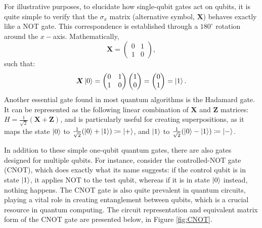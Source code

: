 For illustrative purposes, to elucidate how single-qubit gates act on qubits, it is quite simple to verify that the $\sigma_x$ matrix (alternative symbol, $\boldsymbol{X}$) behaves exactly like a NOT gate. This correspondence is established through a $180^{\circ}$ rotation around the $x-$axis. Mathematically,
\begin{equation}
\boldsymbol{X} = 
\begin{pmatrix}
0 & 1 \\
1 & 0
\end{pmatrix},
\end{equation}
such that:
\begin{equation}
\boldsymbol{X}\ket{0}
=
\begin{pmatrix}
0 & 1 \\
1 & 0
\end{pmatrix}
\begin{pmatrix}
1 \\
0
\end{pmatrix}
=
\begin{pmatrix}
0 \\
1
\end{pmatrix}
=
\ket{1}.
\end{equation}
Another essential gate found in most quantum algorithms is the Hadamard gate. It can be represented as the following linear combination of $\boldsymbol{X}$ and $\boldsymbol{Z}$ matrices: $H = \frac{1}{\sqrt{2}}\left(\boldsymbol{X} + \boldsymbol{Z}\right)$, and is particularly useful for creating superpositions, as it maps the state $\ket{0}$ to $\frac{1}{\sqrt{2}}(\ket{0} + \ket{1}) \coloneq \ket{+}$, and $\ket{1}$ to $\frac{1}{\sqrt{2}}(\ket{0} - \ket{1}) \coloneq \ket{-}$.

In addition to these simple one-qubit quantum gates, there are also gates designed for multiple qubits. For instance, consider the controlled-NOT gate (CNOT), which does exactly what its name suggests: if the control qubit is in state $\ket{1}$, it applies NOT to the test qubit, whereas if it is in state $\ket{0}$ instead, nothing happens. The CNOT gate is also quite prevalent in quantum circuits, playing a vital role in creating entanglement between qubits, which is a crucial resource in quantum computing. The circuit representation and equivalent matrix form of the CNOT gate are presented below, in Figure \ref{fig:CNOT}.

